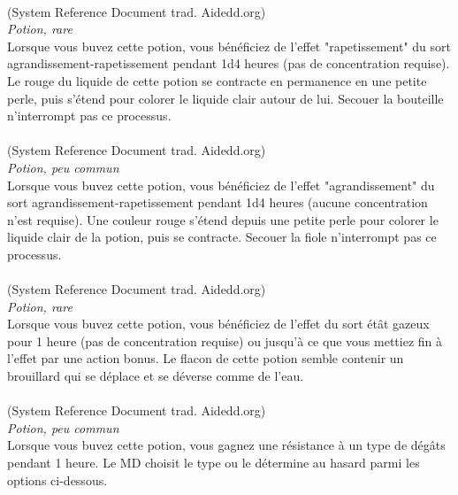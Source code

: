 \\
{\small (System Reference Document trad. Aidedd.org)}\\
{\small \it Potion, rare}\\
Lorsque vous buvez cette potion, vous bénéficiez de l'effet "rapetissement" du sort agrandissement-rapetissement pendant 1d4 heures (pas de concentration requise). Le rouge du liquide de cette potion se contracte en permanence en une petite perle, puis s'étend pour colorer le liquide clair autour de lui. Secouer la bouteille n'interrompt pas ce processus. \\

\\
{\small (System Reference Document trad. Aidedd.org)}\\
{\small \it Potion, peu commun}\\
Lorsque vous buvez cette potion, vous bénéficiez de l'effet "agrandissement" du sort agrandissement-rapetissement pendant 1d4 heures (aucune concentration n'est requise). Une couleur rouge s'étend depuis une petite perle pour colorer le liquide clair de la potion, puis se contracte. Secouer la fiole n'interrompt pas ce processus. \\

\\
{\small (System Reference Document trad. Aidedd.org)}\\
{\small \it Potion, rare}\\
Lorsque vous buvez cette potion, vous bénéficiez de l'effet du sort étât gazeux pour 1 heure (pas de concentration requise) ou jusqu'à ce que vous mettiez fin à l'effet par une action bonus. Le flacon de cette potion semble contenir un brouillard qui se déplace et se déverse comme de l'eau. \\

\\
{\small (System Reference Document trad. Aidedd.org)}\\
{\small \it Potion, peu commun}\\
Lorsque vous buvez cette potion, vous gagnez une résistance à un type de dégâts pendant 1 heure. Le MD choisit le type ou le détermine au hasard parmi les options ci-dessous.

